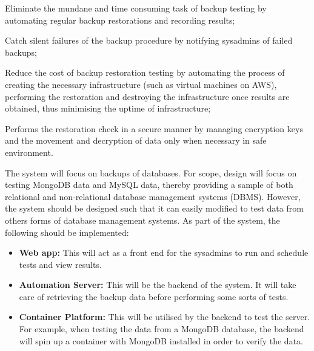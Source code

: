 \begin{AO}
	\item \label{ao1} Eliminate the mundane and time consuming task of backup testing by automating regular backup restorations and recording results;
	\item \label{ao2} Catch silent failures of the backup procedure by notifying sysadmins of failed backups;
	\item \label{ao3} Reduce the cost of backup restoration testing by automating the process of creating the necessary infrastructure (such as virtual machines on AWS), performing the restoration and destroying the infrastructure once results are obtained, thus minimising the uptime of infrastructure;
	\item \label{ao4} Performs the restoration check in a secure manner by managing encryption keys and the movement and decryption of data only when necessary in safe environment.
\end{AO}

\noindent The system will focus on backups of databases. For scope, design will focus on testing MongoDB data and MySQL data, thereby providing a sample of both relational and non-relational database management systems (DBMS). However, the system should be designed such that it can easily modified to test data from others forms of database management systems. As part of the system, the following should be implemented:

\begin{itemize}
	\item \textbf{Web app:} This will act as a front end for the sysadmins to run and schedule tests and view results.
	\item \textbf{Automation Server:} This will be the backend of the system. It will take care of retrieving the backup data before performing some sorts of tests.
	\item \textbf{Container Platform:} This will be utilised by the backend to test the server. For example, when testing the data from a MongoDB database, the backend will spin up a container with MongoDB installed in order to verify the data. 
\end{itemize}